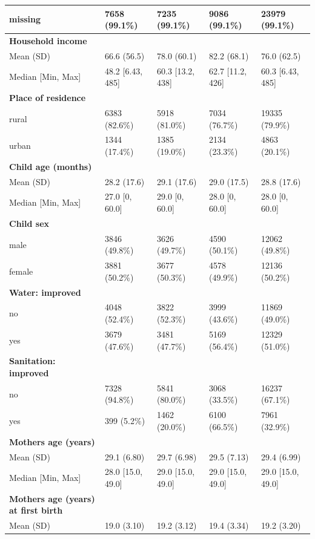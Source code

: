 \documentclass[a4paper, 11pt]{article} %
\begin{document}
\begin{table}[!htbp]
{{\begin{tabular}{lllll}
    missing &	7658 (99.1\%) &	7235 (99.1\%) &	9086 (99.1\%) & 23979 (99.1\%) \\ \hline
    \textbf{Household income} & & & &  \\						
    Mean (SD) &	66.6 (56.5) &	78.0 (60.1) &	82.2 (68.1) &	76.0 (62.5) \\
    Median [Min, Max] &	48.2 [6.43, 485] & 60.3 [13.2, 438] & 62.7 [11.2, 426] & 60.3 [6.43, 485] \\ \hline
    \textbf{Place of residence} & & & &  \\						
    rural &	6383 (82.6\%) &	5918 (81.0\%) &	7034 (76.7\%) &	19335 (79.9\%) \\
    urban &	1344 (17.4\%) &	1385 (19.0\%) &	2134 (23.3\%) &	4863 (20.1\%) \\ \hline
    \textbf{Child age (months)} & & & &  \\						
    Mean (SD) &	28.2 (17.6) &	29.1 (17.6) &	29.0 (17.5) & 28.8 (17.6) \\
    Median [Min, Max] &	27.0 [0, 60.0] &	29.0 [0, 60.0] & 28.0 [0, 60.0]	& 28.0 [0, 60.0] \\ \hline
    \textbf{Child sex} & & & &  \\						
    male &	3846 (49.8\%) &	3626 (49.7\%) &	4590 (50.1\%) & 12062 (49.8\%) \\
    female &	3881 (50.2\%) &	3677 (50.3\%) &	4578 (49.9\%) & 12136 (50.2\%) \\ \hline
    \textbf{Water: improved} & & & &  \\						
    no &	4048 (52.4\%) &	3822 (52.3\%) &	3999 (43.6\%) & 11869 (49.0\%) \\
    yes &	3679 (47.6\%) &	3481 (47.7\%) &	5169 (56.4\%) & 12329 (51.0\%) \\ \hline
    \textbf{Sanitation: improved} & & & &  \\						
    no &	7328 (94.8\%) &	5841 (80.0\%) &	3068 (33.5\%) & 16237 (67.1\%) \\
    yes &	399 (5.2\%) &	1462 (20.0\%) &	6100 (66.5\%) & 7961 (32.9\%) \\ \hline
    \textbf{Mothers age (years)} & & & &  \\						
    Mean (SD) &	29.1 (6.80) &	29.7 (6.98) &	29.5 (7.13) & 29.4 (6.99) \\
    Median [Min, Max] &	28.0 [15.0, 49.0] & 29.0 [15.0, 49.0] &	29.0 [15.0, 49.0] &	29.0 [15.0, 49.0] \\ \hline
    \textbf{Mothers age (years) at first birth} & & & &  \\						
    Mean (SD) &	19.0 (3.10) &	19.2 (3.12) &	19.4 (3.34) & 19.2 (3.20) \\

\end{tabular}}}
\end{table}
\end{document}
